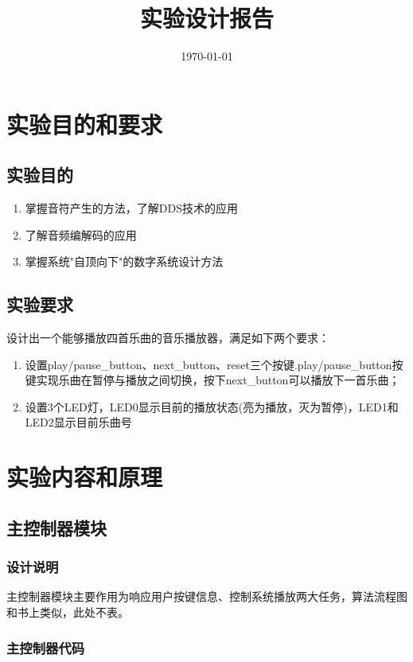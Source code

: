 \documentclass{../source/zjureport}
\title{实验设计报告}
\date{\today}
\begin{document}
    \makecover
    \makeheader

    \section{实验目的和要求}
        \subsection{实验目的}
        \begin{enumerate}
            \item 掌握音符产生的方法，了解DDS技术的应用
            \item 了解音频编解码的应用
            \item 掌握系统"自顶向下"的数字系统设计方法
        \end{enumerate}

        \subsection{实验要求}
        设计出一个能够播放四首乐曲的音乐播放器，满足如下两个要求：
        \begin{enumerate}
            \item 设置play/pause_button、next_button、reset三个按键.play/pause_button按键实现乐曲在暂停与播放之间切换，按下next_button可以播放下一首乐曲；
            \item 设置3个LED灯，LED0显示目前的播放状态(亮为播放，灭为暂停)，LED1和LED2显示目前乐曲号
        \end{enumerate}

    \section{实验内容和原理}
        \subsection{主控制器模块}
            \subsubsection{设计说明}
            主控制器模块主要作用为响应用户按键信息、控制系统播放两大任务，算法流程图和书上类似，此处不表。
            \subsubsection{主控制器代码}
            
        
\end{document}
